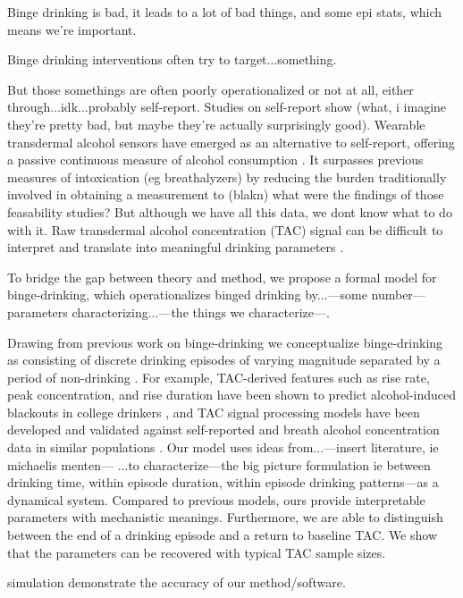 Binge drinking is bad, it leads to a lot of bad things, 
and some epi stats, which means we're important.

Binge drinking interventions often try to target...something.

But those somethings are often poorly operationalized or not at all, either through...idk...probably
self-report. Studies on self-report show
(what, i imagine they're pretty bad, but maybe they're actually surprisingly good). 
Wearable transdermal alcohol sensors have emerged as an alternative to self-report,
offering a passive continuous measure of alcohol consumption
\parencite{fairbairn2025,gunn2023}. It surpasses previous measures of intoxication (eg
breathalyzers) by reducing the burden traditionally involved in obtaining a measurement to (blakn)
 what were the findings of those feasability studies?  
But although we have all this data, we dont know what to do with it.
Raw transdermal alcohol concentration (TAC) signal
can be difficult to interpret and translate into meaningful drinking parameters
\parencite{gunn2023,kianersi2023}.

To bridge the gap between theory and method, we propose a formal model for binge-drinking, which operationalizes
binged drinking by...---some number--- parameters characterizing...---the things we
characterize---. 

Drawing from previous work on binge-drinking we conceptualize
binge-drinking as consisting of discrete drinking episodes of varying magnitude
separated by a period of non-drinking \parencite{greenfield2000}.
For example, TAC-derived features such as rise rate, peak concentration, and rise duration
have been shown to predict alcohol-induced blackouts in college drinkers
\parencite{richards2024}, and TAC signal processing models have been developed and validated
against self-reported and breath alcohol concentration data in similar populations
\parencite{kianersi2023}.
Our model uses ideas from...---insert literature, ie michaelis menten---
...to characterize---the big picture formulation ie between drinking time, within episode
duration, within episode drinking patterns---as a dynamical system. 
Compared to previous models, ours provide interpretable parameters with mechanistic meanings.
Furthermore, we are able to distinguish between the end of a drinking episode and 
a return to baseline TAC. We show that the parameters can be recovered with typical
TAC sample sizes.

simulation demonstrate the accuracy of our method/software.

